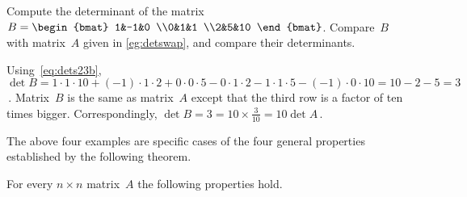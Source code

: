 \begin{example} 
Compute the determinant of the matrix
\(B=\begin{bmat} 1&-1&0
\\0&1&1
\\2&5&10 \end{bmat}\).
Compare~\(B\) with matrix~\(A\) given in \cref{eg:detswap}, and compare their determinants.
\begin{solution} 
Using~\eqref{eq:dets23b}, \(\det B 
=1\cdot1\cdot10 +(-1)\cdot1\cdot2 +0\cdot0\cdot5
-0\cdot1\cdot2 -1\cdot1\cdot5 -(-1)\cdot0\cdot10 
=10-2-5=3\)\,.  
Matrix~\(B\) is the same as matrix~\(A\) except that the third row is a factor of ten times bigger.
Correspondingly, \(\det B=3=10\times\frac3{10}=10\det A\)\,.
\end{solution}
\end{example}






The above four examples are specific cases of the four general properties established by the following theorem. 


\begin{theorem} \label{thm:ppdet} 
For every \(n\times n\) matrix~\(A\) the following properties hold.
\end{theorem}

